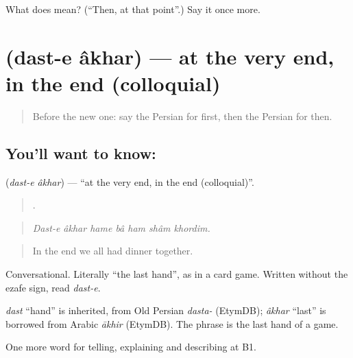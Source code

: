\begin{tcolorbox}[breakable,colback=teal!4,colframe=teal!35!black,title={Before you move on}]
What does  mean? (\textquotedblleft{}Then, at that point\textquotedblright{}.) Say it once more.
\end{tcolorbox}
\section[\texorpdfstring{\fa{دست} \fa{آخر} (dast-e âkhar)}{دست آخر (dast-e âkhar)}]{  (dast-e âkhar) — at the very end, in the end (colloquial)}

\label{lesson:FA-C303-dast-e-akhar}



\begin{quote}
Before the new one: say the Persian for first, then the Persian for then.
\end{quote}

\subsection*{You'll want to know:  }
\textbf{ } (\emph{dast-e âkhar}) — \textquotedblleft{}at the very end, in the end (colloquial)\textquotedblright{}.

\begin{quote}
      .
\end{quote}

\begin{quote}
\emph{Dast-e âkhar hame bâ ham shâm khordim.}
\end{quote}

\begin{quote}
In the end we all had dinner together.
\end{quote}

Conversational. Literally \textquotedblleft{}the last hand\textquotedblright{}, as in a card game. Written without the ezafe sign, read \emph{dast-e}.

\begin{cousinweb}
\emph{dast} \textquotedblleft{}hand\textquotedblright{} is inherited, from Old Persian \emph{dasta-} (EtymDB); \emph{âkhar} \textquotedblleft{}last\textquotedblright{} is borrowed from Arabic \emph{ākhir} (EtymDB). The phrase is the last hand of a game.
\end{cousinweb}

\begin{grammarlens}[title={What you've built}]
One more word for telling, explaining and describing at B1.
\end{grammarlens}

